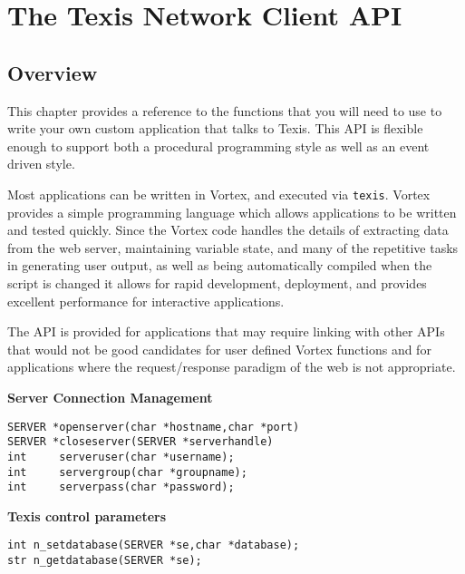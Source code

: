

\chapter{The Texis Network Client API}{\label{Part:V:Chp:tnapi}}{\label{Part:V:Chp:Embed}}
\section{Overview}
This chapter provides a reference to the functions that you will need to
use to write your own custom application that talks to Texis.  This API
is flexible enough to support both a procedural programming style as well
as an event driven style.

Most applications can be written in Vortex, and executed via
\verb`texis`.  Vortex provides a simple programming language which
allows applications to be written and tested quickly.  Since the Vortex
code handles the details of extracting data from the web server,
maintaining variable state, and many of the repetitive tasks in
generating user output, as well as being automatically compiled when
the script is changed it allows for rapid development, deployment, and
provides excellent performance for interactive applications.

The API is provided for applications that may require linking with other APIs
that would not be good candidates for user defined Vortex functions and for
applications where the request/response paradigm of the web is not appropriate.

\SYNOPSIS

{\bf Server Connection Management }
\begin{verbatim}
SERVER *openserver(char *hostname,char *port)
SERVER *closeserver(SERVER *serverhandle)
int     serveruser(char *username);
int     servergroup(char *groupname);
int     serverpass(char *password);
\end{verbatim}

{\bf Texis control parameters }
\begin{verbatim}
int n_setdatabase(SERVER *se,char *database);
str n_getdatabase(SERVER *se);
\end{verbatim}

